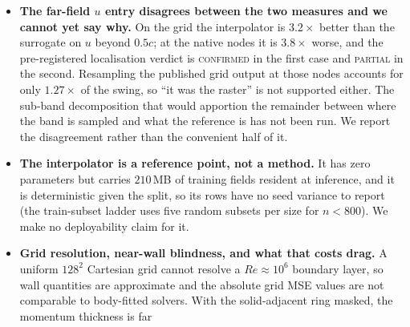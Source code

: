 \begin{itemize}
``this estimator'', not ``every parameter-space estimator''. \emph{(ii)} The
least-squares family bound is one band, registered on $u$ and also computed on $p$; $v$ and
$\nu_t$ were not run through it. It is a bound only where the node count far exceeds the
$800$ free parameters of the projection (\autoref{sec:interp}), and it runs on all $200$
cases. \emph{(iii)} The body-fitted arm is tested and reverses the near-wall reading
(\autoref{sec:interp}), but it is a \emph{bound}, not a deployed estimator: the published
weights in that frame win at the paired median and on $115/200$ cases while losing on the
case-mean ($1.71\times$), so we claim the family is not barred from the wall, and not that
the estimator beats the surrogate there. The frame is also undefined on $4.98\%$ of
near-wall nodes, so a blend is genuinely required on those nodes and beyond the strip, and
the criterion that excludes them was derived from a failed gate rather than registered
before it. \emph{(iv)} The \texttt{full} split only; the head-to-head was not re-run
at native nodes on \texttt{reynolds} or \texttt{aoa}.
\item \textbf{The far-field $u$ entry disagrees between the two measures and we cannot yet
say why.} On the grid the interpolator is $3.2\times$ better than the surrogate on $u$
beyond $0.5c$; at the native nodes it is $3.8\times$ worse, and the pre-registered
localisation verdict is \textsc{confirmed} in the first case and \textsc{partial} in the
second. Resampling the published grid output at those nodes accounts for only $1.27\times$
of the swing, so ``it was the raster'' is not supported either. The sub-band decomposition
that would apportion the remainder between where the band is sampled and what the reference
is has not been run. We report the disagreement rather than the convenient half of it.
\item \textbf{The interpolator is a reference point, not a method.} It has zero parameters
but carries $210$\,MB of training fields resident at inference, and it is deterministic
given the split, so its rows have no seed variance to report (the train-subset ladder uses
five random subsets per size for $n<800$). We make no deployability claim for it.
\item \textbf{Grid resolution, near-wall blindness, and what that costs drag.} A uniform
$128^2$ Cartesian grid cannot resolve a $Re \approx 10^6$ boundary layer, so wall
quantities are approximate and the absolute grid MSE values are not comparable to
body-fitted solvers. With the solid-adjacent ring masked, the momentum thickness is far

\end{itemize}
